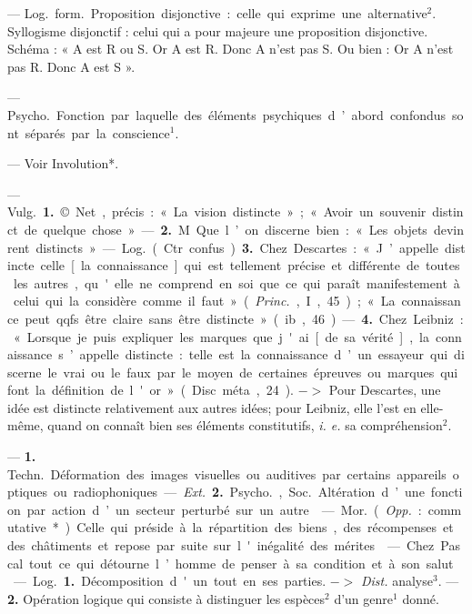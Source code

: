 \begin{itemize}[leftmargin=1cm, label=, itemsep=1pt]
 — \si{Log.} \si{form.} Proposition
disjonctive : celle qui exprime une
alternative$^2$. Syllogisme disjonctif :
celui qui a pour majeure une proposition disjonctive. Schéma : « A
est R ou S. Or A est R. Donc A n'est
pas S. Ou bien : Or A n’est pas R.
Donc A est S ».

 — \si{Psycho.} Fonction par
laquelle des éléments psychiques
d’abord confondus sont séparés par
la conscience$^1$.

 — Voir Involution*.

 — \si{Vulg.} {\bf 1.} © Net, précis :
« La vision distincte » ; « Avoir un
souvenir distinct de quelque chose ».
— {\bf 2.} M Que l’on discerne bien :
« Les objets devinrent distincts ».

— \si{Log.} (Ctr. confus) {\bf 3.} Chez
Descartes : « J’appelle distincte celle
[la connaissance] qui est tellement
précise et différente de toutes les
autres, qu'elle ne comprend en soi
que ce qui paraît manifestement à
celui qui la considère comme il faut »
({\it Princ.}, I, 45); « La connaissance
peut qqfs. être claire sans être distincte » (ib., 46). — {\bf 4.} Chez Leibniz :
« Lorsque je puis expliquer les marques que j'ai [de sa vérité], la connaissance s’appelle distincte : telle
est la connaissance d’un essayeur
qui discerne le vrai ou le faux par
le moyen de certaines épreuves ou
marques qui font la définition de
l'or » (Disc. méta, 24). $->$ Pour
Descartes, une idée est distincte
relativement aux autres idées; pour
Leibniz, elle l’est en elle-même,
quand on connaît bien ses éléments
constitutifs, {\it i. e.} sa compréhension$^2$.

 — {\bf 1.} \si{Techn.} Déformation
des images visuelles ou auditives par
certains appareils optiques ou radiophoniques. — {\it Ext.} {\bf 2.} \si{Psycho.}, \si{Soc.}
Altération d’une fonction par action
d’un secteur perturbé sur un autre.

 — \si{Mor.} ({\it Opp.} :
commutative*). Celle qui préside à la
répartition des biens, des récompenses et des châtiments et repose
par suite sur l'inégalité des mérites.

 — Chez Pascal
tout ce qui détourne l’homme de
penser à sa condition et à son salut.

 — \si{Log.} {\bf 1.} Décomposition
d'un tout en ses parties. $->$ {\it Dist.}
analyse$^3$. — {\bf 2.} Opération logique
qui consiste à distinguer les espèces$^2$
d'un genre$^1$ donné.


\end{itemize}
